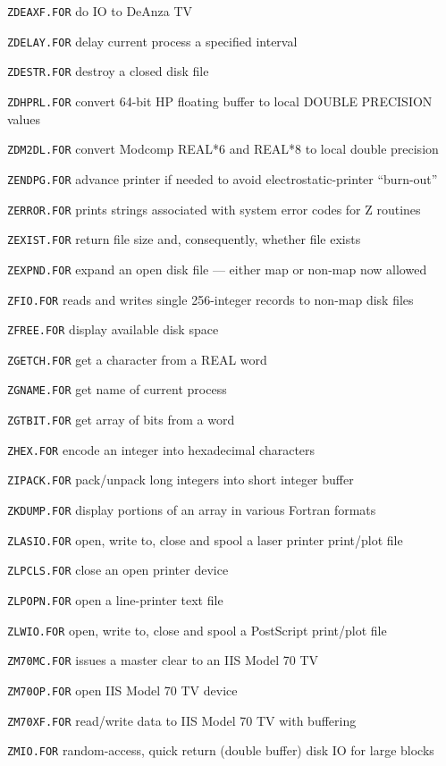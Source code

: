{\item{\tt ZDEAXF.FOR} do IO to DeAnza TV
\item{\tt ZDELAY.FOR} delay current process a specified interval
\item{\tt ZDESTR.FOR} destroy a closed disk file
\item{\tt ZDHPRL.FOR} convert 64-bit HP floating buffer to local DOUBLE PRECISION values
\item{\tt ZDM2DL.FOR} convert Modcomp REAL*6 and REAL*8 to local double precision
\item{\tt ZENDPG.FOR} advance printer if needed to avoid electrostatic-printer ``burn-out''
\item{\tt ZERROR.FOR} prints strings associated with system error codes for Z routines
\item{\tt ZEXIST.FOR} return file size and, consequently, whether file exists
\item{\tt ZEXPND.FOR} expand an open disk file --- either map or non-map now allowed
\item{\tt ZFIO.FOR} reads and writes single 256-integer records to non-map disk files
\item{\tt ZFREE.FOR} display available disk space
\item{\tt ZGETCH.FOR} get a character from a REAL word
\item{\tt ZGNAME.FOR} get name of current process
\item{\tt ZGTBIT.FOR} get array of bits from a word
\item{\tt ZHEX.FOR} encode an integer into hexadecimal characters
\item{\tt ZIPACK.FOR} pack/unpack long integers into short integer buffer
\item{\tt ZKDUMP.FOR} display portions of an array in various Fortran formats
\item{\tt ZLASIO.FOR} open, write to, close and spool a laser printer print/plot file
\item{\tt ZLPCLS.FOR} close an open printer device
\item{\tt ZLPOPN.FOR} open a line-printer text file
\item{\tt ZLWIO.FOR} open, write to, close and spool a PostScript print/plot file
\item{\tt ZM70MC.FOR} issues a master clear to an IIS Model 70 TV
\item{\tt ZM70OP.FOR} open IIS Model 70 TV device
\item{\tt ZM70XF.FOR} read/write data to IIS Model 70 TV with buffering
\item{\tt ZMIO.FOR} random-access, quick return (double buffer) disk IO for large blocks
}
